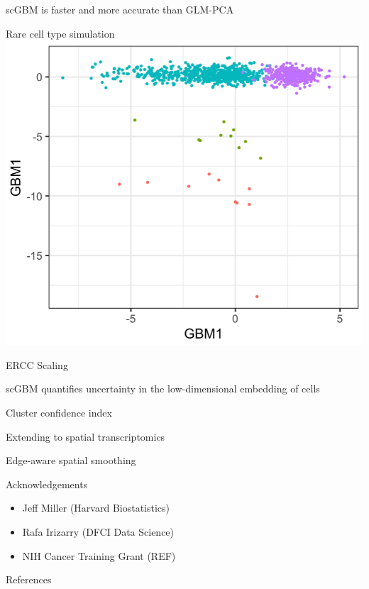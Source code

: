 \documentclass[aspectratio=43]{beamer}
\begin{document}
\begin{frame}{scGBM is faster and more accurate than GLM-PCA}

\end{frame}

\begin{frame}{Rare cell type simulation}
\centering
\includegraphics[scale=0.25]{Fig/single_marker_scGBM.png}
\end{frame}

\begin{frame}{ERCC Scaling}

\end{frame}

\begin{frame}{scGBM quantifies uncertainty in the low-dimensional embedding of cells}

\end{frame}

\begin{frame}{Cluster confidence index}

\end{frame}

\begin{frame}{Extending to spatial transcriptomics}

\end{frame}

\begin{frame}{Edge-aware spatial smoothing}

\end{frame}

\begin{frame}{Acknowledgements}
\begin{itemize}
\item Jeff Miller (Harvard Biostatistics)
\item Rafa Irizarry (DFCI Data Science)
\item NIH Cancer Training Grant (REF) 
\end{itemize}
\end{frame}

\begin{frame}{References}

\end{frame}
\end{document}
